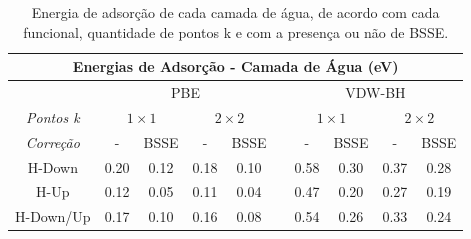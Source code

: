 \begin{table}[b!]
	\centering
	\caption{Energia de adsorção de cada camada de água, de acordo com cada funcional, quantidade de pontos k e com a presença ou não de BSSE.\label{tab:agua}}
	\begin{tabular}{cccccccccc} 
		\hline\hline
		\multicolumn{10}{c}{\textbf{Energias de Adsorção - Camada de Água (eV})}                                                                                           \\ 
		\midrule
		&   \multicolumn{4}{c}{PBE}                                      &      &  \multicolumn{4}{c}{VDW-BH}                                             \\ 
		\cmidrule{1-10}
		\textit{Pontos k} &   \multicolumn{2}{c}{$1\times1$} &  \multicolumn{2}{c}{$2\times2$} & & \multicolumn{2}{c}{$1\times1$} &  \multicolumn{2}{c}{$2\times2$}  \\ 
		\cmidrule{1-10}
		\textit{Correção} & - & BSSE                 & - & BSSE                   &    & - & BSSE                  & - & BSSE                       \\ 
		\midrule
		H-Down            & 0.20 & 0.12                  & 0.18 & 0.10                     & & 0.58 & 0.30                   & 0.37 & 0.28                   \\
		H-Up             & 0.12 & 0.05                   & 0.11 & 0.04                &      & 0.47 & 0.20                    & 0.27 & 0.19                     \\
		H-Down/Up    & 0.17 & 0.10                  & 0.16 & 0.08                  &   & 0.54 & 0.26               & 0.33 & 0.24                     \\
		\hline\hline
	\end{tabular}
\end{table}
